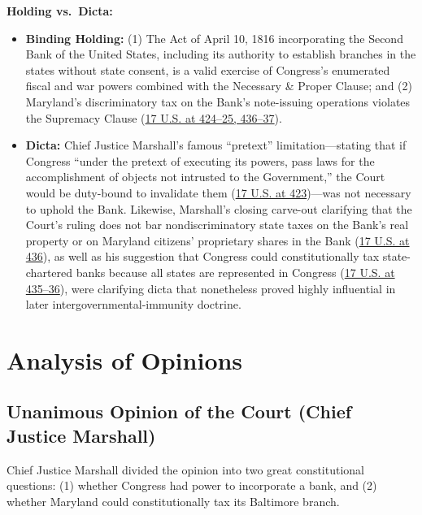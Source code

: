 \documentclass[12pt]{article}
\begin{document}
\textbf{Holding vs.\ Dicta:}
\begin{itemize}
    \item \textbf{Binding Holding:} (1) The Act of April 10, 1816 incorporating the Second Bank of the United States, including its authority to establish branches in the states without state consent, is a valid exercise of Congress's enumerated fiscal and war powers combined with the Necessary \& Proper Clause; and (2) Maryland's discriminatory tax on the Bank's note-issuing operations violates the Supremacy Clause (\href{https://supreme.justia.com/cases/federal/us/17/316/}{17 U.S. at 424--25, 436--37}).
    \item \textbf{Dicta:} Chief Justice Marshall's famous ``pretext'' limitation---stating that if Congress ``under the pretext of executing its powers, pass laws for the accomplishment of objects not intrusted to the Government,'' the Court would be duty-bound to invalidate them (\href{https://supreme.justia.com/cases/federal/us/17/316/}{17 U.S. at 423})---was not necessary to uphold the Bank. Likewise, Marshall's closing carve-out clarifying that the Court's ruling does not bar nondiscriminatory state taxes on the Bank's real property or on Maryland citizens' proprietary shares in the Bank (\href{https://supreme.justia.com/cases/federal/us/17/316/}{17 U.S. at 436}), as well as his suggestion that Congress could constitutionally tax state-chartered banks because all states are represented in Congress (\href{https://supreme.justia.com/cases/federal/us/17/316/}{17 U.S. at 435--36}), were clarifying dicta that nonetheless proved highly influential in later intergovernmental-immunity doctrine.
\end{itemize}

\section{Analysis of Opinions}

\subsection{Unanimous Opinion of the Court (Chief Justice Marshall)}

Chief Justice Marshall divided the opinion into two great constitutional questions: (1) whether Congress had power to incorporate a bank, and (2) whether Maryland could constitutionally tax its Baltimore branch.
\end{document}
